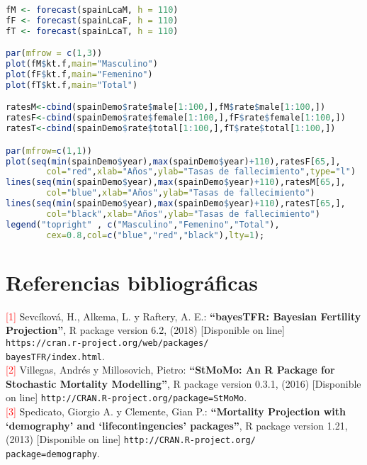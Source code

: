 \begin{lstlisting}[language=R, caption=C\'odigo R para modelo de simulaci\'on estoc\'astica de mortalidad correspondiente a la sección 2.3]
fM <- forecast(spainLcaM, h = 110)
fF <- forecast(spainLcaF, h = 110)
fT <- forecast(spainLcaT, h = 110)

par(mfrow = c(1,3))
plot(fM$kt.f,main="Masculino")
plot(fF$kt.f,main="Femenino")
plot(fT$kt.f,main="Total")

ratesM<-cbind(spainDemo$rate$male[1:100,],fM$rate$male[1:100,])
ratesF<-cbind(spainDemo$rate$female[1:100,],fF$rate$female[1:100,])
ratesT<-cbind(spainDemo$rate$total[1:100,],fT$rate$total[1:100,])

par(mfrow=c(1,1))
plot(seq(min(spainDemo$year),max(spainDemo$year)+110),ratesF[65,],
        col="red",xlab="Años",ylab="Tasas de fallecimiento",type="l")
lines(seq(min(spainDemo$year),max(spainDemo$year)+110),ratesM[65,],
        col="blue",xlab="Años",ylab="Tasas de fallecimiento")
lines(seq(min(spainDemo$year),max(spainDemo$year)+110),ratesT[65,],
        col="black",xlab="Años",ylab="Tasas de fallecimiento")
legend("topright" , c("Masculino","Femenino","Total"),
        cex=0.8,col=c("blue","red","black"),lty=1);
\end{lstlisting}


\section{Referencias bibliogr\'aficas}

\noindent \textcolor{red}{[1]} Sevcíková, H., Alkema, L. y Raftery, A. E.: \textbf{``bayesTFR: Bayesian Fertility Projection''}, R package version 6.2, (2018) [Disponible on line] \texttt{https://cran.r-project.org/web/packages/\\
bayesTFR/index.html}.\\ 

\noindent \textcolor{red}{[2]} Villegas, Andr\'es y Millosovich, Pietro: \textbf{``StMoMo: An R Package for Stochastic Mortality Modelling''}, R package version 0.3.1, (2016) [Disponible on line] \texttt{http://CRAN.R-project.org/package=StMoMo}.\\

\noindent \textcolor{red}{[3]} Spedicato, Giorgio A. y Clemente, Gian P.: \textbf{``Mortality Projection with `demography' and `lifecontingencies' packages''}, R package version 1.21, (2013) [Disponible on line] \texttt{http://CRAN.R-project.org/\\ package=demography}.\\







